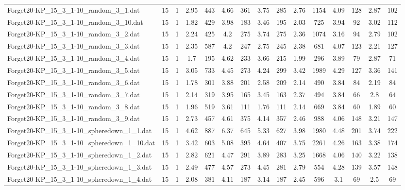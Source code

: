 \begin{table}[!ht]
{\begin{tabular}{lcccccccccccccc}
Forget20-KP\_15\_3\_1-10\_random\_3\_1.dat & 15 & 1 & 2.95 & 443 & 4.66 & 361 & 3.75 & 285 & 2.76 & 1154 & 4.09 & 128 & 2.87 & 102 \\
Forget20-KP\_15\_3\_1-10\_random\_3\_10.dat & 15 & 1 & 1.82 & 429 & 3.98 & 183 & 3.46 & 195 & 2.03 & 725 & 3.94 & 92 & 3.02 & 112 \\
Forget20-KP\_15\_3\_1-10\_random\_3\_2.dat & 15 & 1 & 2.24 & 425 & 4.2 & 275 & 3.74 & 275 & 2.36 & 1074 & 3.16 & 94 & 2.79 & 102 \\
Forget20-KP\_15\_3\_1-10\_random\_3\_3.dat & 15 & 1 & 2.35 & 587 & 4.2 & 247 & 2.75 & 245 & 2.38 & 681 & 4.07 & 123 & 2.21 & 127 \\
Forget20-KP\_15\_3\_1-10\_random\_3\_4.dat & 15 & 1 & 1.7 & 195 & 4.62 & 233 & 3.66 & 215 & 1.99 & 296 & 3.89 & 79 & 2.87 & 71 \\
Forget20-KP\_15\_3\_1-10\_random\_3\_5.dat & 15 & 1 & 3.05 & 733 & 4.45 & 273 & 4.24 & 299 & 3.42 & 1989 & 4.29 & 127 & 3.36 & 141 \\
Forget20-KP\_15\_3\_1-10\_random\_3\_6.dat & 15 & 1 & 1.78 & 301 & 3.88 & 201 & 2.58 & 209 & 2.14 & 490 & 3.84 & 84 & 2.19 & 84 \\
Forget20-KP\_15\_3\_1-10\_random\_3\_7.dat & 15 & 1 & 2.14 & 319 & 3.95 & 165 & 3.45 & 163 & 2.37 & 494 & 3.84 & 66 & 2.8 & 64 \\
Forget20-KP\_15\_3\_1-10\_random\_3\_8.dat & 15 & 1 & 1.96 & 519 & 3.61 & 111 & 1.76 & 111 & 2.14 & 669 & 3.84 & 60 & 1.89 & 60 \\
Forget20-KP\_15\_3\_1-10\_random\_3\_9.dat & 15 & 1 & 2.73 & 457 & 4.61 & 375 & 4.14 & 357 & 2.46 & 988 & 4.06 & 148 & 3.21 & 147 \\
Forget20-KP\_15\_3\_1-10\_spheredown\_1\_1.dat & 15 & 1 & 4.62 & 887 & 6.37 & 645 & 5.33 & 627 & 3.98 & 1980 & 4.48 & 201 & 3.74 & 222 \\
Forget20-KP\_15\_3\_1-10\_spheredown\_1\_10.dat & 15 & 1 & 3.42 & 603 & 5.08 & 395 & 4.64 & 407 & 3.75 & 2261 & 4.26 & 163 & 3.38 & 174 \\
Forget20-KP\_15\_3\_1-10\_spheredown\_1\_2.dat & 15 & 1 & 2.82 & 621 & 4.47 & 291 & 3.89 & 283 & 3.25 & 1668 & 4.06 & 140 & 3.22 & 138 \\
Forget20-KP\_15\_3\_1-10\_spheredown\_1\_3.dat & 15 & 1 & 2.49 & 477 & 4.57 & 273 & 4.45 & 281 & 2.79 & 554 & 4.28 & 139 & 3.57 & 148 \\
Forget20-KP\_15\_3\_1-10\_spheredown\_1\_4.dat & 15 & 1 & 2.08 & 381 & 4.11 & 187 & 3.14 & 187 & 2.45 & 596 & 3.1 & 69 & 2.5 & 69 \\

\end{tabular}}
\end{table}
